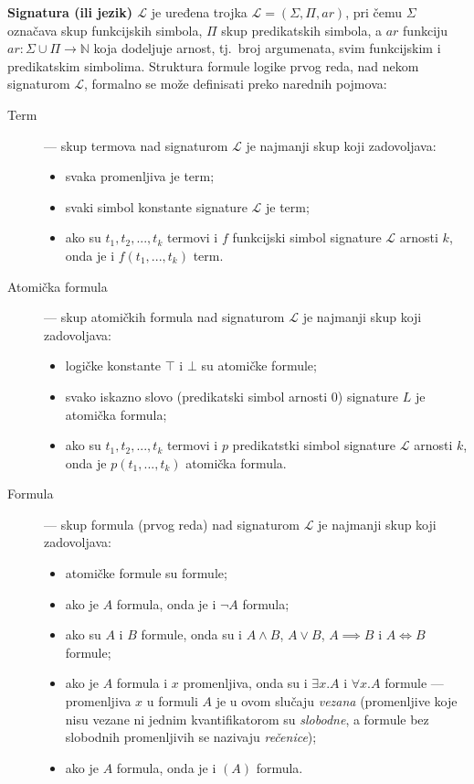 \documentclass[a4paper,10pt]{article}
\begin{document}
\textbf{Signatura (ili jezik) $\mathcal{L}$} je uređena trojka $\mathcal{L} = (\Sigma, \Pi, ar)$, pri čemu $\Sigma$ označava skup funkcijskih simbola, $\Pi$ skup predikatskih simbola, a $ar$ funkciju $ar: \Sigma \cup \Pi \rightarrow \mathbb{N}$ koja dodeljuje arnost, tj.~broj argumenata, svim funkcijskim i predikatskim simbolima. Struktura formule logike prvog reda, nad nekom signaturom $\mathcal{L}$, formalno se može definisati preko narednih pojmova:
\begin{description}
    \item[Term] --- skup termova nad signaturom $\mathcal{L}$ je najmanji skup koji zadovoljava:
    \begin{itemize}
        \item svaka promenljiva je term;
        \item svaki simbol konstante signature $\mathcal{L}$ je term;
        \item ako su $t_1, t_2, ..., t_k$ termovi i $f$ funkcijski simbol signature $\mathcal{L}$ arnosti $k$, onda je i $f(t_1, ..., t_k)$ term. 
    \end{itemize}
    \item[Atomička formula] --- skup atomičkih formula nad signaturom $\mathcal{L}$ je najmanji skup koji zadovoljava:
    \begin{itemize}
        \item logičke konstante $\top$ i $\bot$ su atomičke formule;
        \item svako iskazno slovo (predikatski simbol arnosti $0$) signature $L$ je atomička formula;
        \item ako su $t_1, t_2, ..., t_k$ termovi i $p$ predikatstki simbol signature $\mathcal{L}$ arnosti $k$, onda je $p(t_1, ..., t_k)$ atomička formula. 
    \end{itemize}
    \item[Formula] --- skup formula (prvog reda) nad signaturom $\mathcal{L}$ je najmanji skup koji zadovoljava:
    \begin{itemize}
        \item atomičke formule su formule;
        \item ako je $A$ formula, onda je i $\lnot A$ formula;
        \item ako su $A$ i $B$ formule, onda su i $A \land B$, $A \lor B$, $A \implies B$ i $A \iff B$ formule;
        \item ako je $A$ formula i $x$ promenljiva, onda su i $\exists x.A$ i $\forall x.A$ formule --- promenljiva $x$ u formuli $A$ je u ovom slučaju \textit{vezana} (promenljive koje nisu vezane ni jednim kvantifikatorom su \textit{slobodne}, a formule bez slobodnih promenljivih se nazivaju \textit{rečenice});
        \item ako je $A$ formula, onda je i $(A)$ formula.
    \end{itemize}
\end{description}
\end{document}
